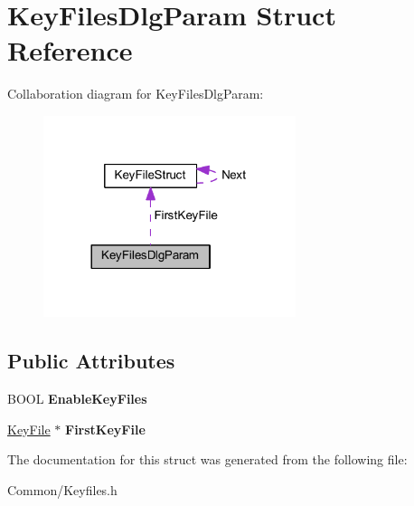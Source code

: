 \hypertarget{struct_key_files_dlg_param}{}\section{Key\+Files\+Dlg\+Param Struct Reference}
\label{struct_key_files_dlg_param}


Collaboration diagram for Key\+Files\+Dlg\+Param\+:
\nopagebreak
\begin{figure}[H]
\begin{center}
\leavevmode
\includegraphics[width=209pt]{struct_key_files_dlg_param__coll__graph}
\end{center}
\end{figure}
\subsection*{Public Attributes}
\begin{DoxyCompactItemize}
\item 
\mbox{\label{struct_key_files_dlg_param_a2cdcefc8a2d50a9128b19a7206d45594}} 
B\+O\+OL {\bfseries Enable\+Key\+Files}
\item 
\mbox{\label{struct_key_files_dlg_param_a4e56f1c213d1a86e2e028c7e121e8b1e}} 
\hyperlink{struct_key_file_struct}{Key\+File} $\ast$ {\bfseries First\+Key\+File}
\end{DoxyCompactItemize}


The documentation for this struct was generated from the following file\+:\begin{DoxyCompactItemize}
\item 
Common/Keyfiles.\+h\end{DoxyCompactItemize}
